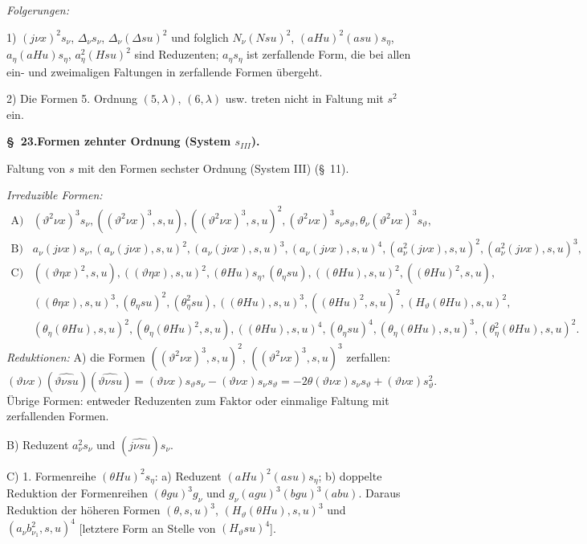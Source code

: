 \documentclass[11pt]{article}
\newcommand{\A}{\Delta}
\begin{document}
\noindent\emph{Folgerungen:}

1) $(j\nu x)^2s_\nu$, $\A_\nu s_\nu$, $\A_\nu(\A su)^2$ und folglich $N_\nu(Nsu)^2$, $(aHu)^2(asu)s_\eta$, $a_\eta(aHu)s_\eta$, $a_\eta^2(Hsu)^2$ sind Reduzenten; $a_\eta s_\eta$ ist zerfallende Form, die bei allen ein- und zweimaligen Faltungen in zerfallende Formen übergeht.

2) Die Formen 5. Ordnung $(5,\lambda)$, $(6,\lambda)$ usw. treten nicht in Faltung mit $s^2$ ein.

\begin{center}\textbf{\S\ 23.\quad Formen zehnter Ordnung (System $s_{III}$).}\end{center}
Faltung von $s$ mit den Formen sechster Ordnung (System III) (\S\ 11).

\noindent\emph{Irreduzible Formen:}
\[
\begin{array}{rl}
\text{A)}& (\vartheta^2\nu x)^3s_\nu,
((\vartheta^2\nu x)^3,s,u),
((\vartheta^2\nu x)^3,s,u)^2,
(\vartheta^2\nu x)^3s_\nu s_\vartheta,
\theta_\nu(\vartheta^2\nu x)^3s_\vartheta,\\[0.3em]
\text{B)}& a_\nu(j\nu x)s_\nu,
(a_\nu(j\nu x),s,u)^2,
(a_\nu(j\nu x),s,u)^3,
(a_\nu(j\nu x),s,u)^4,
(a_\nu^2(j\nu x),s,u)^2,
(a_\nu^2(j\nu x),s,u)^3,\\[0.3em]
\text{C)}& ((\vartheta\eta x)^2,s,u),
((\vartheta\eta x),s,u)^2,
(\theta Hu)s_\eta,
(\theta_\eta su),
((\theta Hu),s,u)^2,
((\theta Hu)^2,s,u),\\
& ((\theta\eta x),s,u)^3,
(\theta_\eta su)^2,
(\theta_\eta^2su),
((\theta Hu),s,u)^3,
((\theta Hu)^2,s,u)^2,
(H_\vartheta(\theta Hu),s,u)^2,\\
& (\theta_\eta(\theta Hu),s,u)^2,
(\theta_\eta(\theta Hu)^2,s,u),
((\theta Hu),s,u)^4,
(\theta_\eta su)^4,
(\theta_\eta(\theta Hu),s,u)^3,
(\theta_\eta^2(\theta Hu),s,u)^2.
\end{array}
\]
\noindent\emph{Reduktionen:}
A) die Formen $((\vartheta^2\nu x)^3,s,u)^2$, $((\vartheta^2\nu x)^3,s,u)^3$ zerfallen:
\[
(\vartheta\nu x)(\widehat{\vartheta\nu su})(\widehat{\vartheta\nu su})=(\vartheta\nu x)s_\vartheta s_\nu-(\vartheta\nu x)s_\nu s_\vartheta=-2\theta(\vartheta\nu x)s_\nu s_\vartheta+(\vartheta\nu x)s_\vartheta^2.
\]
Übrige Formen: entweder Reduzenten zum Faktor oder einmalige Faltung mit zerfallenden Formen.

B) Reduzent $a_\nu^2s_\nu$ und $(\widehat{j\nu su})s_\nu$.

C) 1. Formenreihe $(\theta Hu)^2s_\eta$: a) Reduzent $(aHu)^2(asu)s_\eta$; b) doppelte Reduktion der Formenreihen $(\theta gu)^3g_\nu$ und $g_\nu(agu)^3(bgu)^3(abu)$. Daraus Reduktion der höheren Formen $(\theta,s,u)^3$, $(H_\vartheta(\theta Hu),s,u)^3$ und $(a_\nu b_{\nu_1}^2,s,u)^4$ [letztere Form an Stelle von $(H_\vartheta su)^4$].
\end{document}
